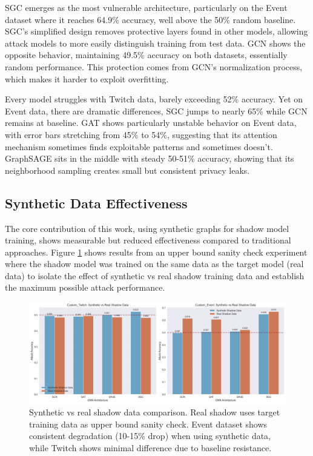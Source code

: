 \documentclass{article}
\begin{document}
SGC emerges as the most vulnerable architecture, particularly on the Event dataset where it reaches 64.9\% accuracy, well above the 50\% random baseline. SGC's simplified design removes protective layers found in other models, allowing attack models to more easily distinguish training from test data. GCN shows the opposite behavior, maintaining 49.5\% accuracy on both datasets, essentially random performance. This protection comes from GCN's normalization process, which makes it harder to exploit overfitting.

Every model struggles with Twitch data, barely exceeding 52\% accuracy. Yet on Event data, there are dramatic differences, SGC jumps to nearly 65\% while GCN remains at baseline. GAT shows particularly unstable behavior on Event data, with error bars stretching from 45\% to 54\%, suggesting that its attention mechanism sometimes finds exploitable patterns and sometimes doesn't. GraphSAGE sits in the middle with steady 50-51\% accuracy, showing that its neighborhood sampling creates small but consistent privacy leaks.

\subsection{Synthetic Data Effectiveness}
The core contribution of this work, using synthetic graphs for shadow model training, shows measurable but reduced effectiveness compared to traditional approaches. Figure \ref{fig:synthetic-comparison} shows results from an upper bound sanity check experiment where the shadow model was trained on the same data as the target model (real data) to isolate the effect of synthetic vs real shadow training data and establish the maximum possible attack performance.

\begin{figure}[H]
\centering
\includegraphics[width=\textwidth]{../Results/visualizations/synthetic_vs_real_comparison.png}
\caption{Synthetic vs real shadow data comparison. Real shadow uses target training data as upper bound sanity check. Event dataset shows consistent degradation (10-15\% drop) when using synthetic data, while Twitch shows minimal difference due to baseline resistance.}
\label{fig:synthetic-comparison}
\end{figure}
\end{document}
